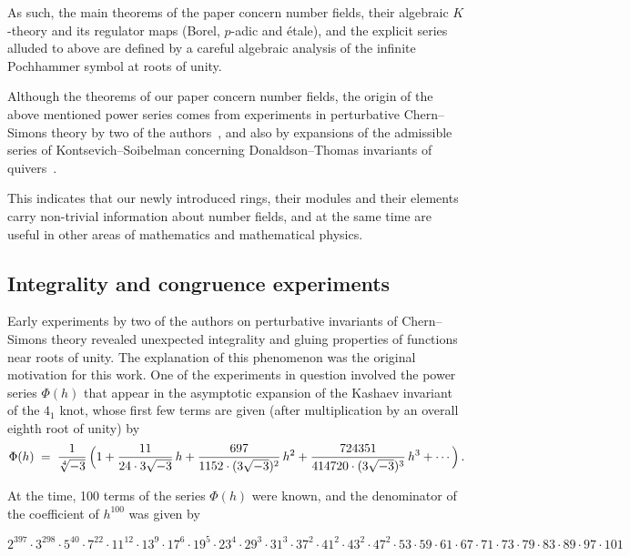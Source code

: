 \documentclass[12pt,reqno]{amsart}
\theoremstyle{definition}
\def\be{\begin{equation}}
\def\ee{\end{equation}}
\def\={\;=\;}
\begin{document}
As such, the main theorems of the paper concern number fields, their algebraic
$K$-theory and its regulator maps (Borel, $p$-adic and \'etale), and the explicit
series alluded to above are defined by a careful algebraic analysis of the infinite
Pochhammer symbol at roots of unity. 

Although the theorems of our paper concern number fields, the origin of the above
mentioned power series comes from experiments in perturbative
Chern--Simons theory by two of the authors~\cite{GZ:kashaev,GZ:qseries}, and 
also by expansions of the admissible series of Kontsevich--Soibelman concerning
Donaldson--Thomas invariants of quivers~\cite{KS:cohomological}.

This indicates that our newly introduced rings, their modules and their elements
carry non-trivial information about number fields, and at the same
time are useful in other areas of mathematics and mathematical physics. 

\subsection{Integrality and congruence experiments}
\label{sub.intexp}

Early experiments by two of the authors on perturbative
invariants of Chern--Simons theory revealed unexpected integrality and gluing
properties of functions near roots of unity. The explanation of this phenomenon was
the original motivation for this work.
One of the experiments in question involved the power series $\Phi(h)$ that appear
in the asymptotic expansion of the Kashaev invariant of the $4_1$ knot, whose first
few terms are given (after multiplication by an overall eighth root of unity)
by~\cite[Eqn.(3)]{GZ:kashaev} 
\be
\label{as41}
\Phi(h)\=  \frac1{\sqrt[4]{-3}}\, 
\Bigl(1 + \frac{11}{24 \cdot 3 \sqrt{-3}}\,h + \frac{697}{1152 \cdot
  (3\sqrt{-3})^2}\,h^2
 + \frac{724351}{414720 \cdot (3 \sqrt{-3})^3}\,h^3 +\cdots\Bigr)\,. 
\ee


\noindent
At the time, 100 terms of the series $\Phi(h)$ were known, and the denominator of
the coefficient of $h^{100}$ was given by
\begin{small}
\begin{equation*}
  2^{397}\!\! \cdot 3^{298}\!\! \cdot 5^{40}\!\! \cdot 7^{22}\!\! \cdot 11^{12}\!\!
  \cdot 13^9 \!\cdot 17^6\!\cdot 19^5\!\cdot 23^4\!\cdot 29^3\!\cdot 31^3\!\cdot 37^2
  \!\cdot 41^2\!\cdot 43^2\!\cdot 47^2\!\cdot 53 \cdot 59 \cdot 61 \cdot 67 \cdot 71
  \cdot 73 \cdot 79 \cdot 83 \cdot 89 \cdot 97 \!\cdot\! 101
\end{equation*}
\end{small}
\end{document}
